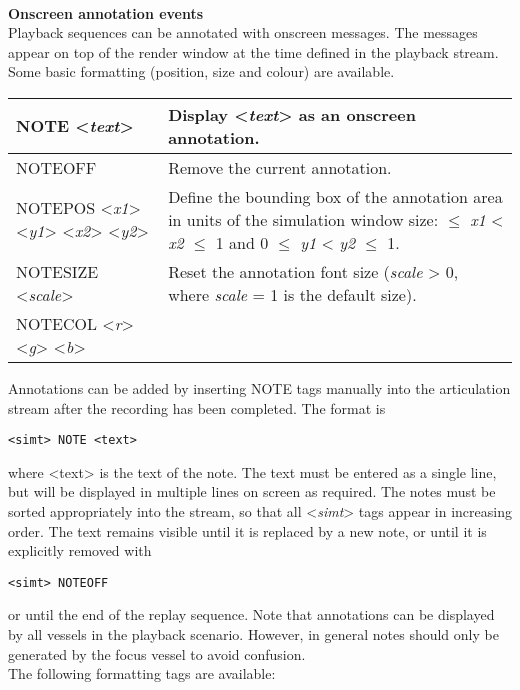 \documentclass[Orbiter Technical Reference.tex]{subfiles}
\begin{document}
\noindent
\\
\textbf{Onscreen annotation events}\\
Playback sequences can be annotated with onscreen messages. The messages appear on top of the render window at the time defined in the playback stream. Some basic formatting (position, size and colour) are available.

\begin{table}[H]
	\centering
	\begin{tabularx}{\textwidth}{ |l|X| }
	\hline\rule{0pt}{2ex}
	NOTE <\textit{text}> & Display <\textit{text}> as an onscreen annotation.\\
	\hline\rule{0pt}{2ex}
	NOTEOFF & Remove the current annotation.\\
	\hline\rule{0pt}{2ex}
	NOTEPOS <\textit{x1}> <\textit{y1}> <\textit{x2}> <\textit{y2}> & Define the bounding box of the annotation area in units of the simulation window size:\newline
0 $\leq$ \textit{x1} < \textit{x2} $\leq$ 1 and 0 $\leq$ \textit{y1} < \textit{y2} $\leq$ 1.\\
	\hline\rule{0pt}{2ex}
	NOTESIZE <\textit{scale}> & Reset the annotation font size (\textit{scale} > 0, where \textit{scale} = 1 is the default size).\\
	\hline\rule{0pt}{2ex}
	NOTECOL <\textit{r}> <\textit{g}> <\textit{b}> &\\
	\hline
	\end{tabularx}
\end{table}

\noindent
Annotations can be added by inserting NOTE tags manually into the articulation stream after the recording has been completed. The format is

\begin{lstlisting}[language=OSFS]
<simt> NOTE <text>
\end{lstlisting}

\noindent
where <text> is the text of the note. The text must be entered as a single line, but will be displayed in multiple lines on screen as required. The notes must be sorted appropriately into the stream, so that all <\textit{simt}> tags appear in increasing order. The text remains visible until it is replaced by a new note, or until it is explicitly removed with

\begin{lstlisting}[language=OSFS]
<simt> NOTEOFF
\end{lstlisting}

\noindent
or until the end of the replay sequence. Note that annotations can be displayed by all vessels in the playback scenario. However, in general notes should only be generated by the focus vessel to avoid confusion.\\
The following formatting tags are available:
\end{document}
